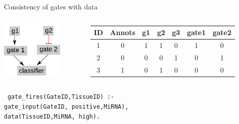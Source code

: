 \documentclass[10pt,dvipsnames]{beamer}
\begin{document}
\begin{frame}[fragile]{Consistency of gates with data}
 \begin{columns}  
 \begin{column}{0.3\textwidth}
 \includegraphics[width=3cm]{constraints_06.png}
 \end{column}
 \begin{column}{0.6\textwidth}
 \begin{tabular}{|c|c|c|c|c|c|c|}
  \hline
  ID&	Annots&	g1&	g2&	g3& gate1& gate2\\
  \hline
  1&	0&	1&	1&	0& 1& 0\\
  2&	0&	0&	0&	1& 0& 1\\
  3&	1&	0&	1&	0& 0& 0\\
  \hline
 \end{tabular}
 \end{column}
 \end{columns}
 \vspace{1.5cm}
 \texttt{
 gate\_fires(GateID,TissueID) :-\\
   \quad gate\_input(GateID,{\color{red} positive},MiRNA),\\
   \quad data(TissueID,MiRNA,{\color{red} high}).\\
 }
 
\end{frame}
\end{document}
